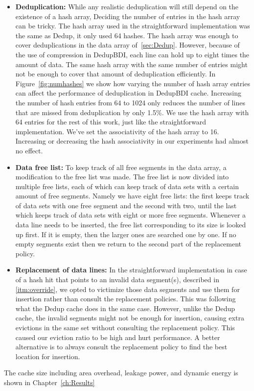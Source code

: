 \begin{itemize}
    \item \textbf{Deduplication:} While any realistic deduplication will still depend on the existence of a hash array, Deciding the number of entries in the hash array can be tricky. The hash array used in the straightforward implementation was the same as Dedup, it only used 64 hashes. The hash array was enough to cover deduplications in the data array of~\ref{sec:Dedup}. However, because of the use of compression in DedupBDI, each line can hold up to eight times the amount of data. The same hash array with the same number of entries might not be enough to cover that amount of deduplication efficiently. In Figure~\ref{fig:numhashes} we show how varying the number of hash array entries can affect the performance of deduplication in DedupBDI cache. Increasing the number of hash entries from 64 to 1024 only reduces the number of lines that are missed from deduplication by only 1.5\%. We use the hash array with 64 entries for the rest of this work, just like the straightforward implementation. We've set the associativity of the hash array to 16. Increasing or decreasing the hash associativity in our experiments had almost no effect.
    \item \textbf{Data free list:} To keep track of all free segments in the data array, a modification to the free list was made. The free list is now divided into multiple free lists, each of which can keep track of data sets with a certain amount of free segments. Namely we have eight free lists: the first keeps track of data sets with one free segment and the second with two, until the last which keeps track of data sets with eight or more free segments. Whenever a data line needs to be inserted, the free list corresponding to its size is looked up first. If it is empty, then the larger ones are searched one by one. If no empty segments exist then we return to the second part of the replacement policy.
    \item \textbf{Replacement of data lines:} In the straightforward implementation in case of a hash hit that points to an invalid data segment(s), described in \ref{itm:override}, we opted to victimize those data segments and use them for insertion rather than consult the replacement policies. This was following what the Dedup cache does in the same case. However, unlike the Dedup cache, the invalid segments might not be enough for insertion, causing extra evictions in the same set without consulting the replacement policy. This caused our eviction ratio to be high and hurt performance. A better alternative is to always consult the replacement policy to find the best location for insertion. 
\end{itemize}
The cache size including area overhead, leakage power, and dynamic energy is shown in Chapter~\ref{ch:Results}